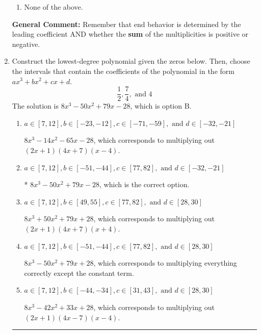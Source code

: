 \documentclass{extbook}[14pt]
\newcommand{\litem}[1]{\item #1

\rule{\textwidth}{0.4pt}}
\begin{document}
\begin{enumerate}
{\begin{enumerate}[label=\Alph*.]
\begin{multicols}{2}
\end{multicols}\item None of the above.\end{enumerate}
\textbf{General Comment:} Remember that end behavior is determined by the leading coefficient AND whether the \textbf{sum} of the multiplicities is positive or negative.
}
\litem{
Construct the lowest-degree polynomial given the zeros below. Then, choose the intervals that contain the coefficients of the polynomial in the form $ax^3+bx^2+cx+d$.
\[ \frac{1}{2}, \frac{7}{4}, \text{ and } 4 \]The solution is \( 8x^{3} -50 x^{2} +79 x -28 \), which is option B.\begin{enumerate}[label=\Alph*.]
\item \( a \in [7, 12], b \in [-23, -12], c \in [-71, -59], \text{ and } d \in [-32, -21] \)

$8x^{3} -14 x^{2} -65 x -28$, which corresponds to multiplying out $(2x + 1)(4x + 7)(x -4)$.
\item \( a \in [7, 12], b \in [-51, -44], c \in [77, 82], \text{ and } d \in [-32, -21] \)

* $8x^{3} -50 x^{2} +79 x -28$, which is the correct option.
\item \( a \in [7, 12], b \in [49, 55], c \in [77, 82], \text{ and } d \in [28, 30] \)

$8x^{3} +50 x^{2} +79 x + 28$, which corresponds to multiplying out $(2x + 1)(4x + 7)(x + 4)$.
\item \( a \in [7, 12], b \in [-51, -44], c \in [77, 82], \text{ and } d \in [28, 30] \)

$8x^{3} -50 x^{2} +79 x + 28$, which corresponds to multiplying everything correctly except the constant term.
\item \( a \in [7, 12], b \in [-44, -34], c \in [31, 43], \text{ and } d \in [28, 30] \)

$8x^{3} -42 x^{2} +33 x + 28$, which corresponds to multiplying out $(2x + 1)(4x -7)(x -4)$.
\end{enumerate}

}
\end{enumerate}
\end{document}
